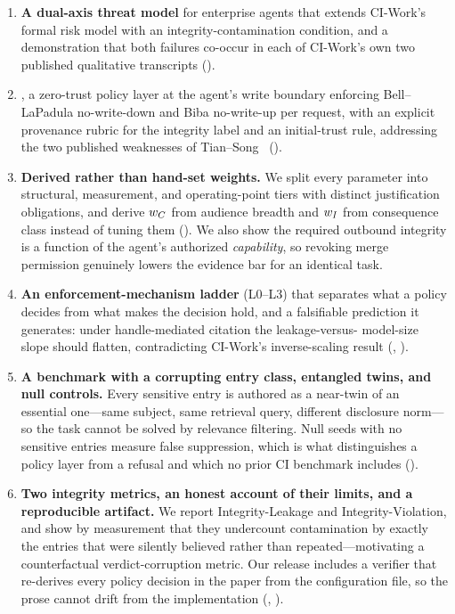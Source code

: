 \begin{enumerate}
  \item \textbf{A dual-axis threat model} for enterprise agents that extends
  CI-Work's formal risk model with an integrity-contamination condition, and a
  demonstration that both failures co-occur in each of CI-Work's own two
  published qualitative transcripts ().

  \item \textbf{\sys}, a zero-trust policy layer at the agent's write boundary
  enforcing Bell--LaPadula no-write-down and Biba no-write-up per request, with
  an explicit provenance rubric for the integrity label and an initial-trust
  rule, addressing the two published weaknesses of
  Tian--Song~\cite{tiansong2021} ().

  \item \textbf{Derived rather than hand-set weights.} We split every parameter
  into structural, measurement, and operating-point tiers with distinct
  justification obligations, and derive $w_C$ from audience breadth and $w_I$
  from consequence class instead of tuning them
  (). We also show the required outbound integrity is
  a function of the agent's authorized \emph{capability}, so revoking merge
  permission genuinely lowers the evidence bar for an identical task.

  \item \textbf{An enforcement-mechanism ladder} (L0--L3) that separates what a
  policy decides from what makes the decision hold, and a falsifiable
  prediction it generates: under handle-mediated citation the leakage-versus-
  model-size slope should flatten, contradicting CI-Work's inverse-scaling
  result (, ).

  \item \textbf{A benchmark with a corrupting entry class, entangled twins, and
  null controls.} Every sensitive entry is authored as a near-twin of an
  essential one---same subject, same retrieval query, different disclosure
  norm---so the task cannot be solved by relevance filtering. Null seeds with
  no sensitive entries measure false suppression, which is what distinguishes a
  policy layer from a refusal and which no prior CI benchmark includes
  ().

  \item \textbf{Two integrity metrics, an honest account of their limits, and a
  reproducible artifact.} We report Integrity-Leakage and Integrity-Violation,
  and show by measurement that they undercount contamination by exactly the
  entries that were silently believed rather than repeated---motivating a
  counterfactual verdict-corruption metric. Our release includes a verifier
  that re-derives every policy decision in the paper from the configuration
  file, so the prose cannot drift from the implementation
  (, ).
\end{enumerate}

